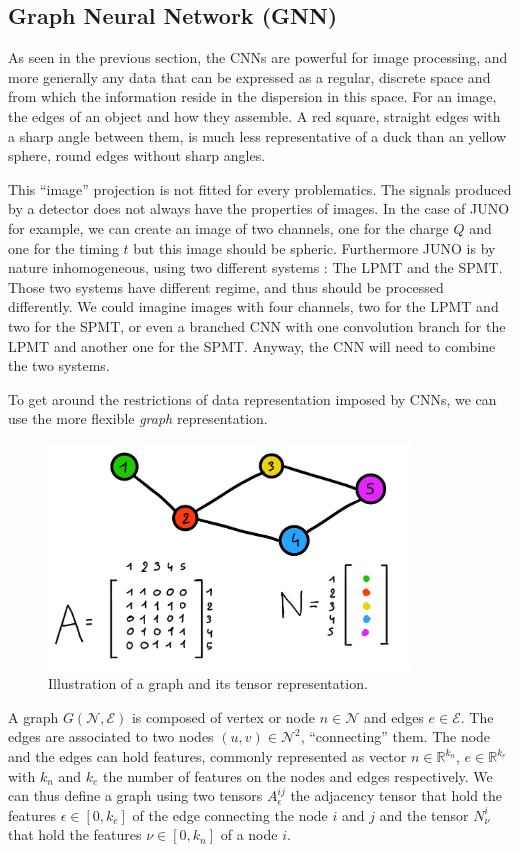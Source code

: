 \documentclass[../main.tex]{subfiles}
\begin{document}
\subsection{Graph Neural Network (GNN)}
\label{sec:ml:gnn}

As seen in the previous section, the CNNs are powerful for image processing, and more generally any data that can be expressed as a regular, discrete space and from which the information reside in the dispersion in this space. For an image, the edges of an object and how they assemble. A red square, straight edges with a sharp angle between them, is much less representative of a duck than an yellow sphere, round edges without sharp angles.

This ``image'' projection is not fitted for every problematics. The signals produced by a detector does not always have the properties of images. In the case of JUNO for example, we can create an image of two channels, one for the charge $Q$ and one for the timing $t$ but this image should be spheric. Furthermore JUNO is by nature inhomogeneous, using two different systems : The LPMT and the SPMT. Those two systems have different regime, and thus should be processed differently. We could imagine images with four channels, two for the LPMT and two for the SPMT, or even a branched CNN with one convolution branch for the LPMT and another one for the SPMT. Anyway, the CNN will need to combine the two systems.

To get around the restrictions of data representation imposed by CNNs, we can use the more flexible \textit{graph} representation.
\begin{figure}[ht]
  \centering
  \includegraphics[height=6cm]{images/ml/graph_illustration.png}
  \caption{Illustration of a graph and its tensor representation.}
  \label{fig:ml:gnn:graph}
\end{figure}
A graph $G(\mathcal{N},\mathcal{E})$ is composed of vertex or node $n \in \mathcal{N}$ and edges $e \in \mathcal{E}$. The edges are associated to two nodes $(u, v) \in \mathcal{N}^2$, ``connecting'' them. The node and the edges can hold features, commonly represented as vector $n \in \mathbb{R}^{k_{n}}$, $e \in \mathbb{R}^{k_{e}}$ with $k_n$ and $k_e$ the number of features on the nodes and edges respectively. We can thus define a graph using two tensors $A^{ij}_{\epsilon}$ the adjacency tensor that hold the features $\epsilon \in [0, k_e]$ of the edge connecting the node $i$ and $j$ and the tensor $N^{i}_{\nu}$ that hold the features $\nu \in [0, k_n]$ of a node $i$.
\end{document}
